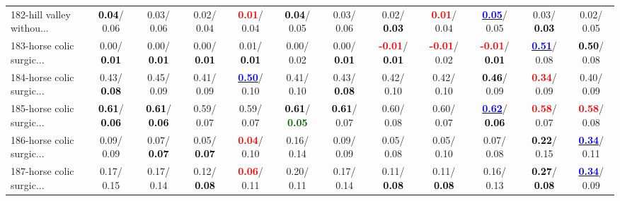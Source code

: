 \begin{table}[h]
\begin{center}
{\begin{tabular}{lc|c|c|c|c|c|c|c|c|c|c}
182-hill valley withou... & \textcolor{black}{\textbf{  0.04}}/  0.06 &   0.03/  0.06 &   0.02/  0.04 & \textcolor{red}{\textbf{  0.01}}/  0.04 & \textcolor{black}{\textbf{  0.04}}/  0.05 &   0.03/  0.06 &   0.02/\textcolor{black}{\textbf{  0.03}} & \textcolor{red}{\textbf{  0.01}}/  0.04 & \underline{\textcolor{blue}{\textbf{  0.05}}}/  0.05 &   0.03/\textcolor{black}{\textbf{  0.03}} &   0.02/  0.05 \\
183-horse colic surgic... &   0.00/\textcolor{black}{\textbf{  0.01}} &   0.00/\textcolor{black}{\textbf{  0.01}} &   0.00/\textcolor{black}{\textbf{  0.01}} &   0.01/\textcolor{black}{\textbf{  0.01}} &   0.00/  0.02 &   0.00/\textcolor{black}{\textbf{  0.01}} & \textcolor{red}{\textbf{ -0.01}}/\textcolor{black}{\textbf{  0.01}} & \textcolor{red}{\textbf{ -0.01}}/  0.02 & \textcolor{red}{\textbf{ -0.01}}/\textcolor{black}{\textbf{  0.01}} & \underline{\textcolor{blue}{\textbf{  0.51}}}/  0.08 & \textcolor{black}{\textbf{  0.50}}/  0.08 \\
184-horse colic surgic... &   0.43/\textcolor{black}{\textbf{  0.08}} &   0.45/  0.09 &   0.41/  0.09 & \underline{\textcolor{blue}{\textbf{  0.50}}}/  0.10 &   0.41/  0.10 &   0.43/\textcolor{black}{\textbf{  0.08}} &   0.42/  0.10 &   0.42/  0.10 & \textcolor{black}{\textbf{  0.46}}/  0.09 & \textcolor{red}{\textbf{  0.34}}/  0.09 &   0.40/  0.09 \\
185-horse colic surgic... & \textcolor{black}{\textbf{  0.61}}/\textcolor{black}{\textbf{  0.06}} & \textcolor{black}{\textbf{  0.61}}/\textcolor{black}{\textbf{  0.06}} &   0.59/  0.07 &   0.59/  0.07 & \textcolor{black}{\textbf{  0.61}}/\textcolor{darkgreen}{\textbf{  0.05}} & \textcolor{black}{\textbf{  0.61}}/  0.07 &   0.60/  0.08 &   0.60/  0.07 & \underline{\textcolor{blue}{\textbf{  0.62}}}/\textcolor{black}{\textbf{  0.06}} & \textcolor{red}{\textbf{  0.58}}/  0.07 & \textcolor{red}{\textbf{  0.58}}/  0.08 \\
186-horse colic surgic... &   0.09/  0.09 &   0.07/\textcolor{black}{\textbf{  0.07}} &   0.05/\textcolor{black}{\textbf{  0.07}} & \textcolor{red}{\textbf{  0.04}}/  0.10 &   0.16/  0.14 &   0.09/  0.09 &   0.05/  0.08 &   0.05/  0.10 &   0.07/  0.08 & \textcolor{black}{\textbf{  0.22}}/  0.15 & \underline{\textcolor{blue}{\textbf{  0.34}}}/  0.11 \\
187-horse colic surgic... &   0.17/  0.15 &   0.17/  0.14 &   0.12/\textcolor{black}{\textbf{  0.08}} & \textcolor{red}{\textbf{  0.06}}/  0.11 &   0.20/  0.11 &   0.17/  0.14 &   0.11/\textcolor{black}{\textbf{  0.08}} &   0.11/\textcolor{black}{\textbf{  0.08}} &   0.16/  0.13 & \textcolor{black}{\textbf{  0.27}}/\textcolor{black}{\textbf{  0.08}} & \underline{\textcolor{blue}{\textbf{  0.34}}}/  0.09 \\

\end{tabular}}
\end{center}
\end{table}
